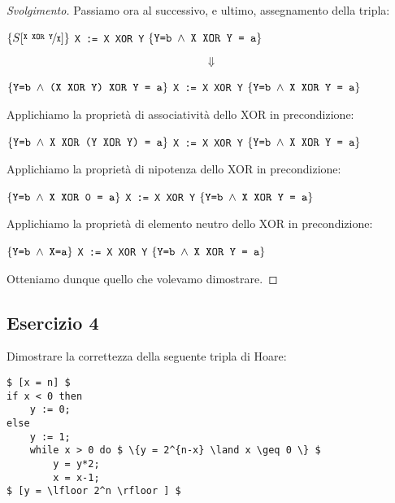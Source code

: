 \documentclass[a4paper, 10pt]{article} %
\begin{document}
\begin{proof}[Svolgimento]
Passiamo ora al successivo, e ultimo, assegnamento della tripla:
\begin{center}
$ \{ S[\nicefrac{\text{\texttt{X XOR Y}}}{\text{\texttt{X}}} ] \} $ 
\texttt{X := X XOR Y} 
$ \{ \text{\texttt{Y=b}} \; \land \; \text{\texttt{X XOR Y = a}} \} $
\end{center}
$$ \Downarrow $$
\begin{center}
$ \{ \text{\texttt{Y=b}} \; \land \; \text{\texttt{(X XOR Y) XOR Y = a}} \} $
\texttt{X := X XOR Y} 
$ \{ \text{\texttt{Y=b}} \; \land \; \text{\texttt{X XOR Y = a}} \} $
\end{center}
Applichiamo la proprietà di associatività dello XOR in precondizione:
\begin{center}
$ \{ \text{\texttt{Y=b}} \; \land \; \text{\texttt{X XOR (Y XOR Y) = a}} \} $
\texttt{X := X XOR Y} 
$ \{ \text{\texttt{Y=b}} \; \land \; \text{\texttt{X XOR Y = a}} \} $
\end{center}
Applichiamo la proprietà di nipotenza dello XOR in precondizione:
\begin{center}
$ \{ \text{\texttt{Y=b}} \; \land \; \text{\texttt{X XOR 0 = a}} \} $
\texttt{X := X XOR Y} 
$ \{ \text{\texttt{Y=b}} \; \land \; \text{\texttt{X XOR Y = a}} \} $
\end{center}
Applichiamo la proprietà di elemento neutro dello XOR in precondizione:
\begin{center}
$ \{ \text{\texttt{Y=b}} \; \land \; \text{\texttt{X=a}} \} $
\texttt{X := X XOR Y} 
$ \{ \text{\texttt{Y=b}} \; \land \; \text{\texttt{X XOR Y = a}} \} $
\end{center}
Otteniamo dunque quello che volevamo dimostrare.
\end{proof}


\subsection{Esercizio 4}
Dimostrare la correttezza della seguente tripla di Hoare:
\begin{lstlisting}[mathescape, numberfirstline=false]
$ [x = n] $
if x < 0 then
	y := 0;
else
	y := 1;
	while x > 0 do $ \{y = 2^{n-x} \land x \geq 0 \} $
		y = y*2;
		x = x-1;
$ [y = \lfloor 2^n \rfloor ] $
\end{lstlisting}
\end{document}
